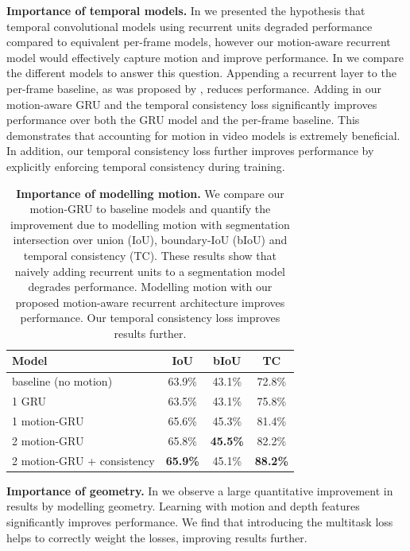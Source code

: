 \textbf{Importance of temporal models.} In  we presented the hypothesis that temporal convolutional models using recurrent units degraded performance compared to equivalent per-frame models, however our motion-aware recurrent model would effectively capture motion and improve performance. In  we compare the different models to answer this question.
Appending a recurrent layer to the per-frame baseline, as was proposed by \citep{patraucean2015spatio,valipour2017recurrent}, reduces performance.
Adding in our motion-aware GRU and the temporal consistency loss significantly improves performance over both the GRU model and the per-frame baseline. This demonstrates that accounting for motion in video models is extremely beneficial.
In addition, our temporal consistency loss further improves performance by explicitly enforcing temporal consistency during training.

\begin{table}[h]
\begin{center}
	\begin{tabular}{l|c|c|c}
    \hline
    Model & IoU & bIoU & TC \\
    \hline\hline
    baseline (no motion) & 63.9\% & 43.1\% & 72.8\% \\
    1 GRU & 63.5\% & 43.1\% & 75.8\% \\
    1 motion-GRU & 65.6\% & 45.3\% & 81.4\% \\
    2 motion-GRU & 65.8\% & \textbf{45.5\%} & 82.2\% \\
    2 motion-GRU + consistency & \textbf{65.9\%} & 45.1\% & \textbf{88.2\%} \\
    \hline
	\end{tabular}
\end{center}
\caption[Importance of modelling motion.]{\textbf{Importance of modelling motion.} We compare our motion-GRU to baseline models and quantify the improvement due to modelling motion with segmentation intersection over union (IoU), boundary-IoU (bIoU) and temporal consistency (TC). These results show that naively adding recurrent units to a segmentation model degrades performance. Modelling motion with our proposed motion-aware recurrent architecture improves performance. Our temporal consistency loss improves results further.}
\label{tbl:motion}
\end{table}

\textbf{Importance of geometry.}
In  we observe a large quantitative improvement in results by modelling geometry. Learning with motion and depth features significantly improves performance. We find that introducing the multitask loss \citep{kendall2017multi} helps to correctly weight the losses, improving results further.

